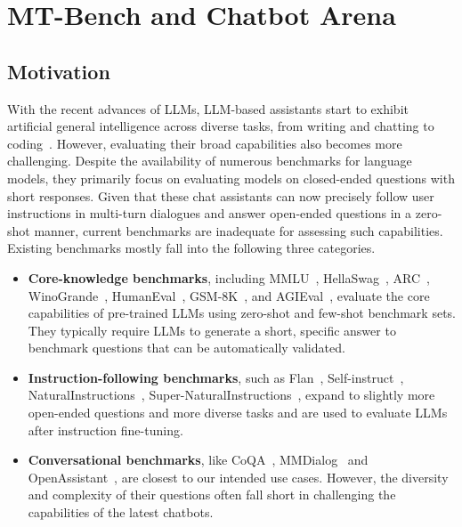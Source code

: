 \section{MT-Bench and Chatbot Arena}
\label{sec:mt-bench}

\subsection{Motivation}
With the recent advances of LLMs, LLM-based assistants start to exhibit artificial general intelligence across diverse tasks, from writing and chatting to coding~\cite{bubeck2023sparks,openai2023gpt4,anil2023palm,srivastava2022beyond}. However, evaluating their broad capabilities also becomes more challenging. 
Despite the availability of numerous benchmarks for language models, they primarily focus on evaluating models on closed-ended questions with short responses. 
Given that these chat assistants can now precisely follow user instructions in multi-turn dialogues and answer open-ended questions in a zero-shot manner, current benchmarks are inadequate for assessing such capabilities. Existing benchmarks mostly fall into the following three categories.
\begin{itemize}
\item \textbf{Core-knowledge benchmarks}, including MMLU~\cite{hendrycks2020measuring}, HellaSwag~\cite{zellers2019hellaswag}, ARC~\cite{clark2018think}, WinoGrande~\cite{sakaguchi2021winogrande}, HumanEval~\cite{chen2021evaluating}, GSM-8K~\cite{cobbe2021training}, and AGIEval~\cite{zhong2023agieval}, evaluate the core capabilities of pre-trained LLMs using zero-shot and few-shot benchmark sets. They typically require LLMs to generate a short, specific answer to benchmark questions that can be automatically validated. %
\item \textbf{Instruction-following benchmarks}, such as  Flan~\cite{longpre2023flan,wei2021finetuned}, Self-instruct~\cite{selfinstruct}, NaturalInstructions~\cite{naturalinstructions}, Super-NaturalInstructions~\cite{supernaturalinstructions}, expand to slightly more open-ended questions and more diverse tasks and are used to evaluate LLMs after instruction fine-tuning.
\item \textbf{Conversational benchmarks}, like CoQA~\cite{reddy2019coqa}, MMDialog~\cite{feng2022mmdialog} and OpenAssistant~\cite{kopf2023openassistant}, are closest to our intended use cases. However, the diversity and complexity of their questions often fall short in challenging the capabilities of the latest chatbots.
\end{itemize}

